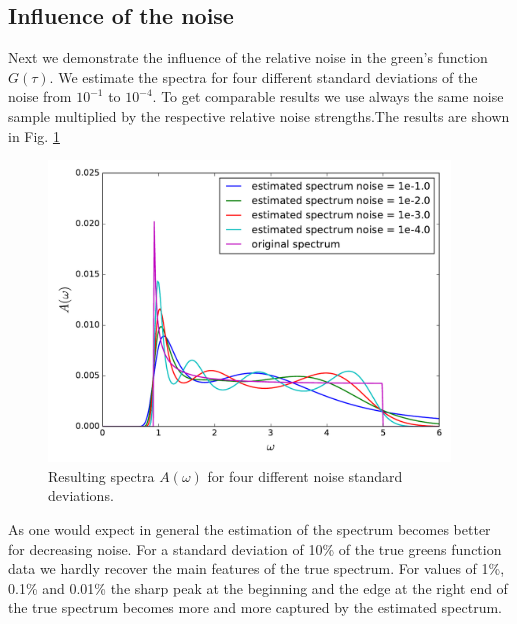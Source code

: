\subsection*{Influence of the noise}
Next we demonstrate the influence of the relative noise in the green's function $G(\tau)$. We estimate the spectra for four different standard deviations of the noise from $10^{-1}$ to $10^{-4}$. To get comparable results we use always the same noise sample  multiplied by the respective relative noise strengths.The results are shown in Fig. \ref{results:fig_5}
\begin{figure}[htbp]
	\centering
	\includegraphics[width=0.95\textwidth]{./images/BCS_varying_noise.pdf}
	\caption{Resulting spectra $A(\omega)$ for four different noise standard deviations.}
	\label{results:fig_5}
\end{figure}
\FloatBarrier
As one would expect in general the estimation of the spectrum becomes better for decreasing noise. For a standard deviation of 10\% of the true greens function data we hardly recover the main features of the true spectrum. For values of 1\%, 0.1\%  and 0.01\% the sharp peak at the beginning and the edge at the right end of the true spectrum becomes more and more captured by the estimated spectrum.

